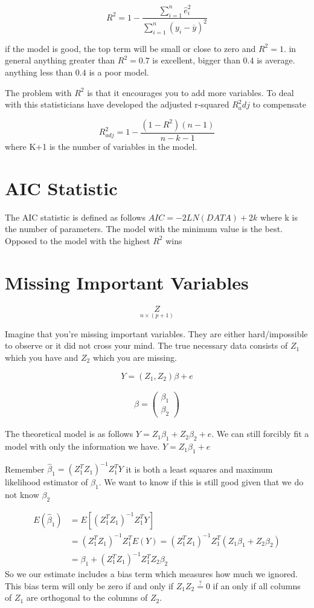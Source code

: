\[R^2 = 1- \frac{\displaystyle\sum_{i=1}^n\hat{e}_i^2}{\displaystyle\sum_{i=1}^n(y_i-\overline{y})^2}\]

if the model is good, the top term will be small or close to zero and $R^2=1$. in general anything greater than $R^2=0.7$ is excellent, bigger than $0.4$ is average. anything less than $0.4$ is a poor model.

The problem with $R^2$ is that it encourages you to add more variables. To deal with this statisticians have developed the adjusted r-squared $R^2_adj$ to compensate

\[R^2_{adj} = 1 - \frac{(1-R^2)(n-1)}{n-k-1}\]
where K+1 is the number of variables in the model.

\section{AIC Statistic}
The AIC statistic is defined as follows $AIC = -2LN(DATA) + 2k$ where k is the number of parameters. The model with the minimum value is the best. Opposed to the model with the highest $R^2$ wins

\section{Missing Important Variables}
\[\underset{n\times(p+1)}{Z}\]

Imagine that you're missing important variables. They are either hard/impossible to observe or it did not cross your mind. The true necessary data consists of $Z_1$ which you have and $Z_2$ which you are missing.

\[Y=(Z_1,Z_2) \beta +e\]

\begin{align*}
    \beta = \begin{pmatrix}
        \beta_1 \\
        \beta_2
    \end{pmatrix}
\end{align*}

The theoretical model is as follows $Y=Z_1\beta_1 + Z_2\beta_2 + e$. We can still forcibly fit a model with only the information we have. $Y=Z_1\beta_1+e$ 

Remember $\hat{\beta}_1 = (Z_1^TZ_1)^{-1}Z_1^TY$ it is both a least squares and maximum likelihood estimator of $\beta_1$. We want to know if this is still good given that we do not know $\beta_2$

\begin{align*}
    E(\hat{\beta}_1) &= E[(Z_1^TZ_1)^{-1}Z_1^TY] \\
    &= (Z_1^TZ_1)^{-1}Z_1^TE(Y)  = (Z_1^TZ_1)^{-1}Z_1^T(Z_1\beta_1+Z_2\beta_2) \\
    &= \beta_1 + (Z_1^TZ_1)^{-1}Z_1^TZ_2\beta_2
\end{align*}
So we our estimate includes a bias term which measures how much we ignored. This bias term will only be zero if and only if $Z_1Z_2 \overset{?}{=} 0$ if an only if all columns of $Z_1$ are orthogonal to the columns of $Z_2$.

